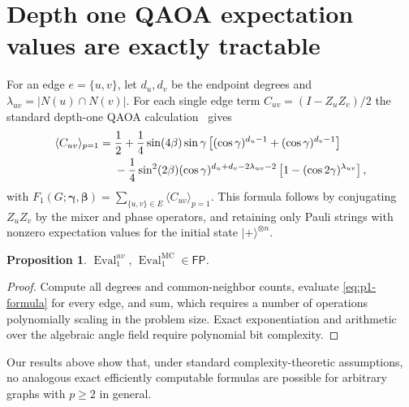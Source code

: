 \documentclass[11pt]{article}
\newtheorem{proposition}[theorem]{Proposition}
\newcommand{\Eval}{\operatorname{Eval}}
\newcommand{\FP}{\mathsf{FP}}
\begin{document}

\nocite{lenstra1982factoring,basu2006algorithms,cohen2013course} %



\appendix







\section{Depth one QAOA expectation values are exactly tractable}\label{sec:p1}

For an edge $e=\{u,v\}$, let $d_u,d_v$ be the endpoint degrees and
$\lambda_{uv}=|N(u)\cap N(v)|$.  
For each single edge term $C_{uv}=(I-Z_uZ_v)/2$ 
the standard depth-one QAOA  calculation~\cite{Wang2018,hadfield2018quantum} gives
\begin{align}
 \langle C_{uv}\rangle_{p=1}
 ={}&\frac12
 +\frac14\sin(4\beta)\sin\gamma
 \left[(\cos\gamma)^{d_u-1}+(\cos\gamma)^{d_v-1}\right]
 \notag\\
 &-\frac14\sin^2(2\beta)
 (\cos\gamma)^{d_u+d_v-2\lambda_{uv}-2}
 \left[1-(\cos2\gamma)^{\lambda_{uv}}\right],
 \label{eq:p1-formula}
\end{align}
with  $F_1(G;\boldsymbol\gamma,\boldsymbol\beta)
 = \sum_{\{u,v\}\in E} \langle C_{uv}\rangle_{p=1}$.
This formula follows by conjugating $Z_uZ_v$ by the mixer and phase operators, and retaining only Pauli
strings with nonzero expectation values for the initial state $|+\rangle^{\otimes n}$. %

\begin{proposition}\label{prop:p1}
$\Eval^{uv}_1,\,\Eval^{\mathrm{MC}}_1\in\FP$.
\end{proposition}

\begin{proof}
Compute all degrees and common-neighbor counts, evaluate \eqref{eq:p1-formula} for every
edge, and sum, which requires a number of operations polynomially scaling in the problem size.  Exact exponentiation and arithmetic over the algebraic angle field require
polynomial bit complexity. 
\end{proof}

Our results above show that, under standard complexity-theoretic assumptions, no analogous exact efficiently computable formulas are possible for arbitrary graphs with $p\geq 2$ in general. 
\end{document}
